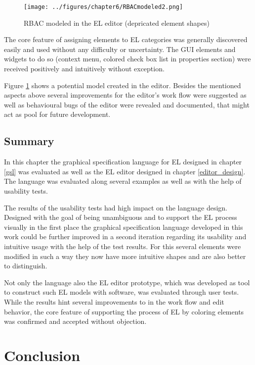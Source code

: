 \documentclass[twoside, openright, 12pt]{book}
\begin{document}
\begin{figure}[bht]
	\centering
	\texttt{[image: ../figures/chapter6/RBACmodeled2.png]}
	\caption{RBAC modeled in the EL editor (depricated element shapes)}
	\label{fig:RBACmodeled2}
\end{figure}

The core feature of assigning elements to EL categories was generally discovered easily and used without any difficulty or uncertainty.
The GUI elements and widgets to do so (context menu, colored check box list in properties section) were received positively and intuitively without exception.

Figure \ref{fig:RBACmodeled2} shows a potential model created in the editor.
Besides the mentioned aspects above several improvements for the editor's work flow were suggested as well as behavioural bugs of the editor were revealed and documented, that might act as pool for future development.



\section{Summary}
\label{eval_summary}
In this chapter the graphical specification language for EL designed in chapter \ref{gsl} was evaluated as well as the EL editor designed in chapter \ref{editor_design}.
The language was evaluated along several examples as well as with the help of usability tests.

The results of the usability tests had high impact on the language design.
Designed with the goal of being unambiguous and to support the EL process visually in the first place the graphical specification language developed in this work could be further improved in a second iteration regarding its usability and intuitive usage with the help of the test results.
For this several elements were modified in such a way they now have more intuitive shapes and are also better to distinguish.

Not only the language also the EL editor prototype, which was developed as tool to construct such EL models with software, was evaluated through user tests.
While the results hint several improvements to in the work flow and edit behavior, the core feature of supporting the process of EL by coloring elements was confirmed and accepted without objection.



\cleardoublepage
\chapter{Conclusion}
\label{conclusion}
\blindtext
\end{document}
